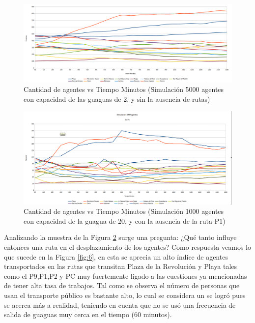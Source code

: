 \documentclass[a4paper,12pt]{article}
\begin{document}
\begin{figure}[H]
    \hspace{-3cm}
    \includegraphics[width=1.4\textwidth]{imgs/s500c2.png}
    \caption{Cantidad de agentes vs Tiempo Minutos (Simulaci\'on 5000 agentes con capacidad de las guaguas de 2, y sin la ausencia de rutas)}
    \label{fig:4}
\end{figure}
\begin{figure}[H]
    \hspace{-3cm}
    \includegraphics[width=1.4\textwidth]{imgs/s1000c20p1.png}
    \caption{Cantidad de agentes vs Tiempo Minutos (Simulaci\'on 1000 agentes con capacidad de la guagua de 20, y con la ausencia de la ruta P1)}
    \label{fig:5}
\end{figure}

Analizando la muestra de la Figura \ref{fig:5} surge una pregunta: ¿Qué tanto influye entonces una ruta en el desplazamiento de los agentes? Como respuesta veamos lo que sucede en la Figura \ref{fig:6}, en esta se aprecia un alto \'indice de agentes transportados en las rutas que transitan Plaza de la Revoluci\'on y Playa tales como el P9,P1,P2 y PC muy fuertemente ligado a las cuestiones ya mencionadas de tener alta tasa de trabajos. Tal como se observa el n\'umero de personas que usan el transporte p\'ublico es bastante alto, lo cual se considera un se logr\'o pues se acerca m\'as a realidad, teniendo en cuenta que no se us\'o una frecuencia de salida de guaguas muy cerca en el tiempo (60 minutos).
\end{document}
